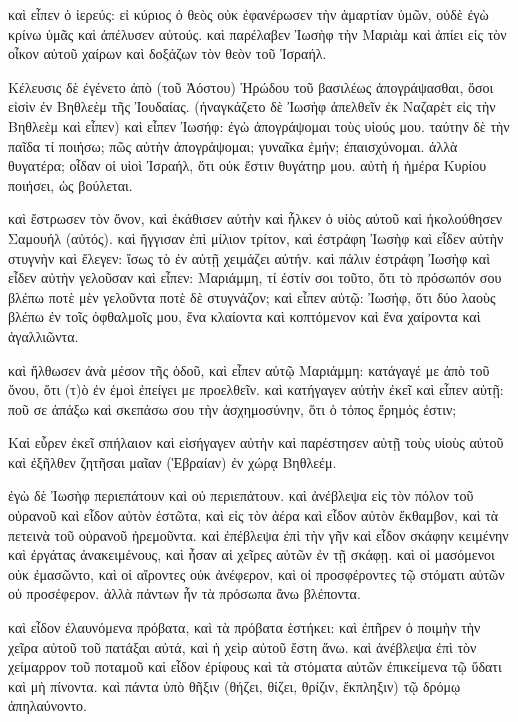 \pend\pstart
καὶ εἶπεν ὁ ἱερεύς: εἰ κύριος ὁ θεὸς οὐκ ἐφανέρωσεν τὴν ἁμαρτίαν ὑμῶν, οὐδὲ ἐγὼ κρίνω ὑμᾶς καὶ ἀπέλυσεν αὐτούς. καὶ παρέλαβεν Ἰωσὴφ τὴν Μαριὰμ καὶ ἀπίει εἰς τὸν οἶκον αὐτοῦ χαίρων καὶ δοξάζων τὸν θεὸν τοῦ Ἰσραήλ.

\pend\pstart
{}

\pend\setcounter{pstartL}{1}\pstart
Κέλευσις δὲ ἐγένετο ἀπὸ (τοῦ Ἀόστου) Ἡρώδου τοῦ βασιλέως ἀπογράψασθαι, ὅσοι εἰσὶν ἐν Βηθλεὲμ τῆς Ἰουδαίας. (ἠναγκάζετο δὲ Ἰωσὴφ ἀπελθεῖν ἐκ Ναζαρὲτ εἰς τὴν Βηθλεὲμ καὶ εἶπεν) καὶ εἶπεν Ἰωσήφ: ἐγὼ ἀπογράψομαι τοὺς υἱούς μου. ταύτην δὲ τὴν παῖδα τί ποιήσω; πῶς αὐτὴν ἀπογράψομαι; γυναῖκα ἐμήν; ἐπαισχύνομαι. ἀλλὰ θυγατέρα; οἶδαν οἱ υἱοὶ Ἰσραήλ, ὅτι οὐκ ἔστιν θυγάτηρ μου. αὐτὴ ἡ ἡμέρα Κυρίου ποιήσει, ὡς βούλεται.

\pend\pstart
καὶ ἔστρωσεν τὸν ὄνον, καὶ ἐκάθισεν αὐτὴν καὶ ἧλκεν ὁ υἱὸς αὐτοῦ καὶ ἠκολούθησεν Σαμουήλ (αὐτός). καὶ ἤγγισαν ἐπὶ μίλιον τρίτον, καὶ ἐστράφη Ἰωσὴφ καὶ εἶδεν αὐτὴν στυγνὴν καὶ ἔλεγεν: ἴσως τὸ ἐν αὐτῇ χειμάζει αὐτήν. καὶ πάλιν ἐστράφη Ἰωσὴφ καὶ εἶδεν αὐτὴν γελοῦσαν καὶ εἶπεν: Μαριάμμη, τί ἐστίν σοι τοῦτο, ὅτι τὸ πρόσωπόν σου βλέπω ποτὲ μὲν γελοῦντα ποτὲ δὲ στυγνάζον; καὶ εἶπεν αὐτῷ: Ἰωσήφ, ὅτι δύο λαοὺς βλέπω ἐν τοῖς ὀφθαλμοῖς μου, ἔνα κλαίοντα καὶ κοπτόμενον καὶ ἔνα χαίροντα καὶ ἀγαλλιῶντα.

\pend\pstart
καὶ ἤλθωσεν ἀνὰ μέσον τῆς ὁδοῦ, καὶ εἶπεν αὐτῷ Μαριάμμη: κατάγαγέ με ἀπὸ τοῦ ὄνου, ὅτι (τ)ὸ ἐν ἐμοὶ ἐπείγει με προελθεῖν. καὶ κατήγαγεν αὐτὴν ἐκεῖ καὶ εἶπεν αὐτῇ: ποῦ σε ἀπάξω καὶ σκεπάσω σου τὴν ἀσχημοσύνην, ὅτι ὁ τόπος ἔρημός ἐστιν;

\pend\pstart
{}

\pend\setcounter{pstartL}{1}\pstart
Καὶ εὗρεν ἐκεῖ σπήλαιον καὶ εἰσήγαγεν αὐτὴν καὶ παρέστησεν αὐτῇ τοὺς υἱοὺς αὐτοῦ καὶ ἐξῆλθεν ζητῆσαι μαῖαν (Ἑβραίαν) ἐν χώρᾳ Βηθλεέμ.

\pend\pstart
ἐγὼ δὲ Ἰωσὴφ περιεπάτουν καὶ οὐ περιεπάτουν. καὶ ἀνέβλεψα εἰς τὸν πόλον τοῦ οὐρανοῦ καὶ εἶδον αὐτὸν ἑστῶτα, καὶ εἰς τὸν ἀέρα καὶ εἶδον αὐτὸν ἔκθαμβον, καὶ τὰ πετεινὰ τοῦ οὐρανοῦ ἠρεμοῦντα. καὶ ἐπέβλεψα ἐπὶ τὴν γῆν καὶ εἶδον σκάφην κειμένην καὶ ἐργάτας ἀνακειμένους, καὶ ἦσαν αἱ χεῖρες αὐτῶν ἐν τῇ σκάφῃ. καὶ οἱ μασόμενοι οὐκ ἐμασῶντο, καὶ οἱ αἴροντες οὐκ ἀνέφερον, καὶ οἱ προσφέροντες τῷ στόματι αὐτῶν οὐ προσέφερον. ἀλλὰ πάντων ἦν τὰ πρόσωπα ἄνω βλέποντα.

\pend\pstart
καὶ εἶδον ἐλαυνόμενα πρόβατα, καὶ τὰ πρόβατα ἑστήκει: καὶ ἐπῆρεν ὁ ποιμὴν τὴν χεῖρα αὐτοῦ τοῦ πατάξαι αὐτά, καὶ ἡ χεὶρ αὐτοῦ ἔστη ἄνω. καὶ ἀνέβλεψα ἐπὶ τὸν χείμαρρον τοῦ ποταμοῦ καὶ εἶδον ἐρίφους καὶ τὰ στόματα αὐτῶν ἐπικείμενα τῷ ὕδατι καὶ μὴ πίνοντα. καὶ πάντα ὑπὸ θῆξιν (θήζει, θίζει, θρίζιν, ἔκπληξιν) τῷ δρόμῳ ἀπηλαύνοντο.

